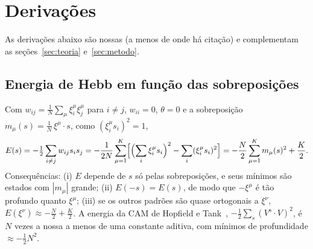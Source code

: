 \section{Derivações}\label{apx:deriv}

As derivações abaixo são nossas (a menos de onde há citação) e complementam as seções~\ref{sec:teoria}
e~\ref{sec:metodo}.

\subsection{Energia de Hebb em função das sobreposições}
Com $w_{ij}=\tfrac1N\sum_{\mu}\xi_i^\mu\xi_j^\mu$ para $i\neq j$, $w_{ii}=0$, $\theta=0$ e a sobreposição
$m_\mu(s)=\tfrac1N\,\xi^\mu\!\cdot s$, como $(\xi_i^\mu s_i)^2=1$,
\[
E(s)=-\tfrac12\sum_{i\neq j}w_{ij}s_is_j
=-\frac1{2N}\sum_{\mu=1}^{K}\Bigl[\Bigl(\sum_i\xi_i^\mu s_i\Bigr)^{2}-\sum_i(\xi_i^\mu s_i)^2\Bigr]
=-\frac N2\sum_{\mu=1}^{K}m_\mu(s)^2+\frac K2 .
\]
Consequências: (i) $E$ depende de $s$ só pelas sobreposições, e seus mínimos são estados com $|m_\mu|$ grande;
(ii) $E(-s)=E(s)$, de modo que $-\xi^\mu$ é tão profundo quanto $\xi^\mu$; (iii) se os outros padrões são
quase ortogonais a $\xi^\nu$, $E(\xi^\nu)\approx-\tfrac N2+\tfrac K2$. A energia da CAM de Hopfield e
Tank~\cite[Eq.~5]{hopfieldtank1985}, $-\tfrac12\sum_s(V^s\!\cdot V)^2$, é $N$ vezes a nossa a menos de uma
constante aditiva, com mínimos de profundidade ${\approx}-\tfrac12N^2$.

